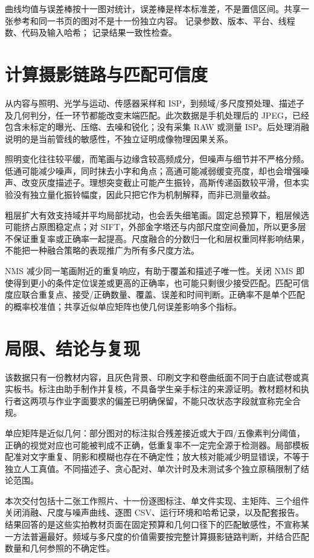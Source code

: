 曲线均值与误差棒按十一图对统计，误差棒是样本标准差，不是置信区间。共享一张参考和同一书页的图对不是十一份独立内容。 记录参数、版本、平台、线程数、代码及输入哈希； 记录结果一致性检查。

\clearpage


\clearpage
\section{计算摄影链路与匹配可信度}
从内容与照明、光学与运动、传感器采样和 ISP，到频域/多尺度预处理、描述子及几何判分，任一环节都能改变末端匹配。此次数据是手机处理后的 JPEG，已经包含未标定的曝光、压缩、去噪和锐化；没有采集 RAW 或测量 ISP。后处理消融说明的是当前管线的敏感性，不独立证明成像物理因果关系。

照明变化往往较平缓，而笔画与边缘含较高频成分，但噪声与细节并不严格分频。低通可能减少噪声，同时抹去小字和角点；高通可能减弱缓变亮度，却也会增强噪声、改变灰度描述子。理想突变截止可能产生振铃，高斯传递函数较平滑，但本实验没有独立量化振铃幅度，因此只把它作为机制解释，而非已测量收益。

粗层扩大有效支持域并平均局部扰动，也会丢失细笔画。固定总预算下，粗层候选可能挤占原图稳定点；对 SIFT，外部金字塔还与内部尺度空间叠加，所以更多层不保证重复率或正确率一起提高。尺度融合的分数归一化和层权重同样影响结果，不能把一种融合策略的表现推广为所有多尺度方法。

NMS 减少同一笔画附近的重复响应，有助于覆盖和描述子唯一性。关闭 NMS 即使得到更小的条件定位误差或更高的正确率，也可能只剩很少接受匹配。匹配可信度应联合重复点、接受/正确数量、覆盖、误差和时间判断。正确率不是单个匹配的概率校准值；共享近似单应矩阵也使几何误差影响多个指标。

\section{局限、结论与复现}
该数据只有一份教材内容，且灰色背景、印刷文字和卷曲纸面不同于白底试卷或真实板书。标注由助手制作并复核，不具备学生亲手标注的来源证明。教材题材和执行者这两项与作业字面要求的偏差已明确保留，不能只改状态字段就宣称完全合规。

单应矩阵是近似几何：部分图对的标注拟合残差接近或大于四/五像素判分阈值，正确的视觉对应也可能被判成不正确，低重复率不一定完全源于检测器。局部模板配准对文字重复、阴影和模糊也存在不确定性；放大核对能减少明显错误，不等于独立人工真值。不同描述子、贪心配对、单次计时及未测试多个独立原稿限制了结论范围。

本次交付包括十二张工作照片、十一份逐图标注、单文件实现、主矩阵、三个组件关闭消融、尺度与噪声曲线、逐图 CSV、运行环境和哈希记录，以及配套报告。结果回答的是这些实拍教材页面在固定预算和几何口径下的匹配敏感性，不宣称某一方法普遍最好。频域与多尺度的价值需要按完整计算摄影链路判断，并结合匹配数量和几何参照的不确定性。

